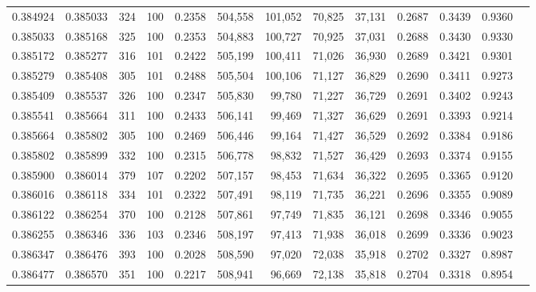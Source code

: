 \begin{tabular}{rrrrrrrrrrrrr}
0.384924 & 0.385033 &   324 & 100 &                                     0.2358 & 504,558 & 101,052 &  70,825 &  37,131 & 0.2687 & 0.3439 & 0.9360 \\
0.385033 & 0.385168 &   325 & 100 &                                     0.2353 & 504,883 & 100,727 &  70,925 &  37,031 & 0.2688 & 0.3430 & 0.9330 \\
0.385172 & 0.385277 &   316 & 101 &                                     0.2422 & 505,199 & 100,411 &  71,026 &  36,930 & 0.2689 & 0.3421 & 0.9301 \\
0.385279 & 0.385408 &   305 & 101 &                                     0.2488 & 505,504 & 100,106 &  71,127 &  36,829 & 0.2690 & 0.3411 & 0.9273 \\
0.385409 & 0.385537 &   326 & 100 &                                     0.2347 & 505,830 &  99,780 &  71,227 &  36,729 & 0.2691 & 0.3402 & 0.9243 \\
0.385541 & 0.385664 &   311 & 100 &                                     0.2433 & 506,141 &  99,469 &  71,327 &  36,629 & 0.2691 & 0.3393 & 0.9214 \\
0.385664 & 0.385802 &   305 & 100 &                                     0.2469 & 506,446 &  99,164 &  71,427 &  36,529 & 0.2692 & 0.3384 & 0.9186 \\
0.385802 & 0.385899 &   332 & 100 &                                     0.2315 & 506,778 &  98,832 &  71,527 &  36,429 & 0.2693 & 0.3374 & 0.9155 \\
0.385900 & 0.386014 &   379 & 107 &                                     0.2202 & 507,157 &  98,453 &  71,634 &  36,322 & 0.2695 & 0.3365 & 0.9120 \\
0.386016 & 0.386118 &   334 & 101 &                                     0.2322 & 507,491 &  98,119 &  71,735 &  36,221 & 0.2696 & 0.3355 & 0.9089 \\
0.386122 & 0.386254 &   370 & 100 &                                     0.2128 & 507,861 &  97,749 &  71,835 &  36,121 & 0.2698 & 0.3346 & 0.9055 \\
0.386255 & 0.386346 &   336 & 103 &                                     0.2346 & 508,197 &  97,413 &  71,938 &  36,018 & 0.2699 & 0.3336 & 0.9023 \\
0.386347 & 0.386476 &   393 & 100 &                                     0.2028 & 508,590 &  97,020 &  72,038 &  35,918 & 0.2702 & 0.3327 & 0.8987 \\
0.386477 & 0.386570 &   351 & 100 &                                     0.2217 & 508,941 &  96,669 &  72,138 &  35,818 & 0.2704 & 0.3318 & 0.8954 \\

\end{tabular}
